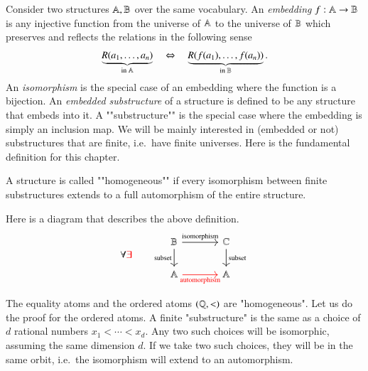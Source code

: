 Consider two structures $\mathbb A, \mathbb B$ over the same vocabulary. An \emph{embedding} $f : \mathbb A \to \mathbb B$ is any injective function from the universe of $\mathbb A$ to the universe of $\mathbb B$ which preserves and reflects the relations in the following sense 
\begin{align*}
\underbrace{R(a_1,\ldots,a_n)}_{\text{in $\mathbb A$}} \quad \Leftrightarrow \quad \underbrace{R(f(a_1),\ldots,f(a_n))}_{\text{in $\mathbb B$}}.
\end{align*}
An \emph{isomorphism} is the special case of an embedding where the function is a bijection. 
An \emph{embedded substructure} of a structure is defined to be any structure that embeds into it. A ""substructure"" is the special case where the embedding is simply an inclusion map. We will be mainly interested in (embedded or not)  substructures that are finite, i.e.~have finite universes. Here is the fundamental definition for this chapter. 

\begin{definition}\label{def:homogeneous}
A structure  is called ""homogeneous"" if every isomorphism between finite substructures extends to a full automorphism of the entire structure. 	
\end{definition}

Here is a diagram that describes the above definition.
\[
\forall \red{\exists} 
\qquad 
\begin{tikzcd}
[column sep=large]
\structb
\ar[r,"\text{isomorphism}"]
\ar[d,"\text{subset}"']
&  \structc 
\ar[d,"\text{subset}"] \\
\structa 
\ar[r,"\text{automorphism}"', color=red]
& \structa 
\end{tikzcd}
\]

\begin{myexample}
	The equality atoms and the ordered atoms $(\mathbb Q, <)$ are "homogeneous". Let us do the proof for the ordered atoms. A finite "substructure" is the same as a choice of $d$ rational numbers $x_1 < \cdots < x_d$. Any two such choices will be isomorphic, assuming the same dimension $d$. If we take two such choices, they will be in the same orbit, i.e.~the isomorphism will extend to an automorphism. \end{myexample}

